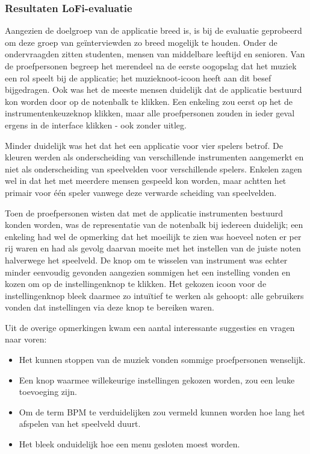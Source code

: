 \documentclass{acm}
\begin{document}
\subsubsection{Resultaten LoFi-evaluatie}
Aangezien de doelgroep van de applicatie breed is, is bij de evaluatie geprobeerd om deze groep van geïnterviewden zo breed mogelijk te houden. Onder de ondervraagden zitten studenten, mensen van middelbare leeftijd en senioren. Van de proefpersonen begreep het merendeel na de eerste oogopslag dat het muziek een rol speelt bij de applicatie; het muzieknoot-icoon heeft aan dit besef bijgedragen. Ook was het de meeste mensen duidelijk dat de applicatie bestuurd kon worden door op de notenbalk te klikken. Een enkeling zou eerst op het de instrumentenkeuzeknop klikken, maar alle proefpersonen zouden in ieder geval ergens in de interface klikken - ook zonder uitleg.

Minder duidelijk was het dat het een applicatie voor vier spelers betrof. De kleuren werden als onderscheiding van verschillende instrumenten aangemerkt en niet als onderscheiding van speelvelden voor verschillende spelers. Enkelen zagen wel in dat het met meerdere mensen gespeeld kon worden, maar achtten het primair voor één speler vanwege deze verwarde scheiding van speelvelden.

Toen de proefpersonen wisten dat met de applicatie instrumenten bestuurd konden worden, was de representatie van de notenbalk bij iedereen duidelijk; een enkeling had wel de opmerking dat het moeilijk te zien was hoeveel noten er per rij waren en had als gevolg daarvan moeite met het instellen van de juiste noten halverwege het speelveld. De knop om te wisselen van instrument was echter minder eenvoudig gevonden aangezien sommigen het een instelling vonden en kozen om op de instellingenknop te klikken. Het gekozen icoon voor de instellingenknop bleek daarmee zo intuïtief te werken als gehoopt: alle gebruikers vonden dat instellingen via deze knop te bereiken waren.

Uit de overige opmerkingen kwam een aantal interessante suggesties en vragen naar voren:
\begin{itemize}
  \item Het kunnen stoppen van de muziek vonden sommige proefpersonen wenselijk.
  \item Een knop waarmee willekeurige instellingen gekozen worden, zou een leuke toevoeging zijn.
  \item Om de term BPM te verduidelijken zou vermeld kunnen worden hoe lang het afspelen van het speelveld duurt.
  \item Het bleek onduidelijk hoe een menu gesloten moest worden.
\end{itemize}
\end{document}
